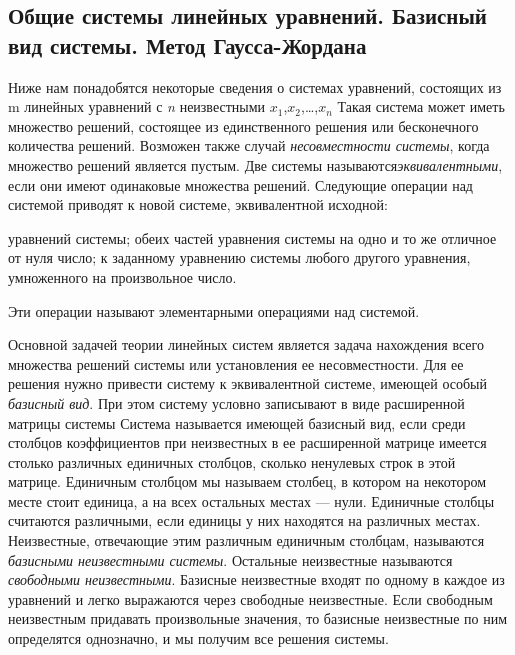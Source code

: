 \documentclass[12pt]{article}
\begin{document}
\subsection{Общие системы линейных уравнений. Базисный вид системы. Метод Гаусса-Жордана}
Ниже нам понадобятся некоторые сведения о системах уравнений, состоящих из m линейных уравнений с \textit {n} неизвестными $x_1$,$x_2$,\dots,$x_\textit{n}$%
Такая система может иметь множество решений, состоящее из единственного решения или бесконечного количества решений. Возможен также случай \textit{несовместности системы}, когда множество решений является пустым. Две системы называются\textit {эквивалентными}, если они имеют одинаковые множества решений. Следующие операции над системой приводят к новой системе, эквивалентной исходной:
		\begin{enumerate}
			\renewcommand{\theenumi}{(\arabic{enumi})}
			\renewcommand{\labelenumi}{\arabic{enumi})}
			 уравнений системы;
			 обеих частей уравнения системы на одно и то же отличное от нуля число;
			 к заданному уравнению системы любого другого уравнения, умноженного на произвольное число.
		\end{enumerate}
Эти операции называют элементарными операциями над системой.

Основной задачей теории линейных систем является задача нахождения всего множества решений системы или установления ее несовместности. Для ее решения нужно привести систему к эквивалентной системе, имеющей особый \textit{базисный вид}. При этом систему условно записывают в виде расширенной матрицы системы
Система называется имеющей базисный вид, если среди столбцов коэффициентов при неизвестных в ее расширенной матрице имеется столько  различных  единичных  столбцов, сколько  ненулевых строк в этой матрице. Единичным столбцом мы называем столбец, в котором на некотором месте стоит единица, а на всех остальных местах — нули. Единичные столбцы считаются различными, если единицы у них находятся на различных местах. Неизвестные, отвечающие этим различным единичным столбцам, называются \textit{базисными неизвестными системы}. Остальные неизвестные называются \textit{свободными неизвестными}. Базисные неизвестные входят по одному в каждое из уравнений и легко выражаются через свободные неизвестные. Если свободным неизвестным придавать произвольные значения, то базисные неизвестные по ним определятся однозначно, и мы получим все решения системы.
\end{document}

